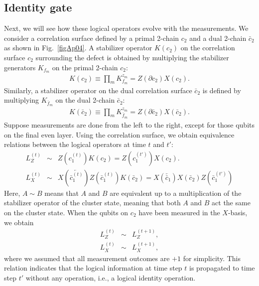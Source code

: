 \subsection*{Identity gate}
Next, we will see how these logical operators evolve with the measurements.
We consider a correlation surface defined by a primal 2-chain $c_2$ and a dual 2-chain $\bar c_2$ as shown in Fig.~\ref{figAp04}.
A stabilizer operator $K(c_2)$ on the correlation surface $c_2$ surrounding the defect is obtained by multiplying the stabilizer generators $K_{f_m}$ on the primal 2-chain $c_2$:
\begin{eqnarray}
K(c_2 ) \equiv \prod _{m} K_{ f_m}^{z_m} = Z(\partial c_2) X(c_2).
\end{eqnarray}
Similarly, a stabilizer operator on the dual correlation surface $\bar c_2$ is defined by multiplying $K_{\bar f_m}$ on the dual 2-chain $\bar c_2$:
\begin{eqnarray}
K(\bar c_2 ) \equiv \prod _{m} K_{\bar f_m}^{z_m} = Z(\partial \bar c_2) X(\bar c_2).
\end{eqnarray}
Suppose measurements are done from the left to the right, except for those qubits on the final even layer.
Using the correlation surface, we obtain equivalence relations between the logical operators at time $t$ and $t'$:
\begin{eqnarray}
L_Z^{(t)} &\sim& Z(c_1^{(t)}) K(c_2 ) = Z(c_1^{(t')}) X(c_2).
\\
L_X^{(t)} &\sim& X(\overleftarrow {\bar c^{(t)}_1}) Z(\bar c^{(t)}_1) K(\bar c_2) = X(\overleftarrow {\bar c_1}) X(\bar c_2) Z(\bar c^{(t')}_1) 
\end{eqnarray}
Here, $ A\sim B$ means that $A$ and $B$ are equivalent up to a multiplication of the stabilizer operator of the cluster state, meaning that both $A$ and $B$ act the same on the cluster state.
When the qubits on $c_2$ have been measured in the $X$-basis, we obtain 
\begin{eqnarray}
L_Z^{(t)} &\sim& L_Z^{(t+1)},
\\
L_X^{(t)} &\sim& L_X^{(t+1)},
\end{eqnarray}
where we assumed that all measurement outcomes are $+1$ for simplicity.
This relation indicates that the logical information at time step $t$ is propagated to time step $t'$ without any operation, i.e., a logical identity operation.

